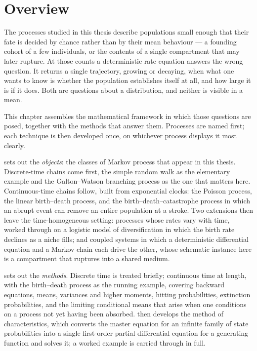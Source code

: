 \section{Overview}
\label{m:sec:overview}

The processes studied in this thesis describe populations small enough that their
fate is decided by chance rather than by their mean behaviour --- a founding cohort
of a few individuals, or the contents of a single compartment that may later
rupture. At those counts a deterministic rate equation answers the wrong question.
It returns a single trajectory, growing or decaying, when what one wants to know is
whether the population establishes itself at all, and how large it is if it does.
Both are questions about a distribution, and neither is visible in a mean.

This chapter assembles the mathematical framework in which those questions are
posed, together with the methods that answer them. Processes are named first; each
technique is then developed once, on whichever process displays it most clearly.

 sets out the \emph{objects}: the classes of Markov process that
appear in this thesis. Discrete-time chains come first, the simple random walk as
the elementary example and the Galton--Watson branching process as the one that
matters here. Continuous-time chains follow, built from exponential clocks: the
Poisson process, the linear birth--death process, and the
birth--death--catastrophe process in which an abrupt event can remove an entire
population at a stroke. Two extensions then leave the time-homogeneous setting:
processes whose rates vary with time, worked through on a logistic model of
diversification in which the birth rate declines as a niche fills; and coupled
systems in which a deterministic differential equation and a Markov chain each
drive the other, whose schematic instance here is a compartment that ruptures into
a shared medium.

 sets out the \emph{methods}. Discrete time is treated briefly;
continuous time at length, with the birth--death process as the running example,
covering backward equations, means, variances and higher moments, hitting
probabilities, extinction probabilities, and the limiting conditional means that
arise when one conditions on a process not yet having been absorbed.
 then develops the method of characteristics, which converts the
master equation for an infinite family of state probabilities into a single
first-order partial differential equation for a generating function and solves it;
a worked example is carried through in full.

